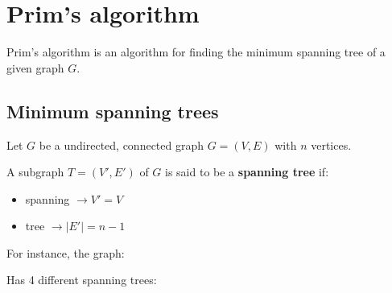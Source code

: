 \documentclass{article}
\begin{document}
\section{Prim's algorithm}

Prim's algorithm is an algorithm for finding the minimum spanning tree of a given graph $G$.


\subsection{Minimum spanning trees}

Let $G$ be a undirected, connected graph $G = (V,E)$ with $n$ vertices.

A subgraph $T = (V',E')$ of $G$ is said to be a \textbf{spanning tree} if:

\begin{itemize}
  \item spanning $\rightarrow V' = V $
  \item tree $\rightarrow |E'| = n-1$
\end{itemize}

For instance, the graph:

\begin{center}
\end{center}

Has 4 different spanning trees:
\end{document}
